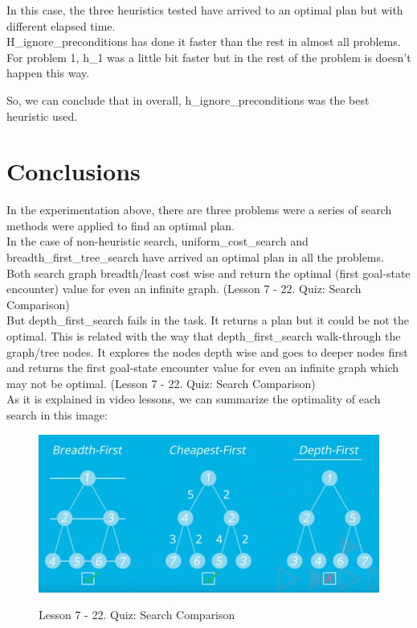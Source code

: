 \documentclass[10pt, a4paper,english]{article}
\begin{document}
In this case, the three heuristics tested have arrived to an optimal plan but with different elapsed time. \\

H\_ignore\_preconditions has done it faster than the rest in almost all problems. For problem 1, h\_1 was a little bit faster but in the rest of the problem is doesn't happen this way.

So, we can conclude that in overall, h\_ignore\_preconditions was the best heuristic used.


\section{Conclusions}

In the experimentation above, there are three problems were a series of search methods were applied to find an optimal plan.\\

In the case of non-heuristic search, uniform\_cost\_search and breadth\_first\_tree\_search have arrived an optimal plan in all the problems. Both search graph breadth/least cost wise and return the optimal (first goal-state encounter) value for even an infinite graph. (Lesson 7 - 22. Quiz: Search Comparison)\\

But depth\_first\_search fails in the task. It returns a plan but it could be not the optimal. This is related with the way that depth\_first\_search walk-through the graph/tree nodes. It explores the nodes depth wise and goes to deeper nodes first and returns the first goal-state encounter value for even an infinite graph which may not be optimal. (Lesson 7 - 22. Quiz: Search Comparison)\\

As it is explained in video lessons, we can summarize the optimality of each search in this image:

\begin{figure}[h]
\begin{center}
\includegraphics[width=1\textwidth]{optimality.png}\\
\caption{Lesson 7 - 22. Quiz: Search Comparison}
\end{center}
\end{figure}
\end{document}
